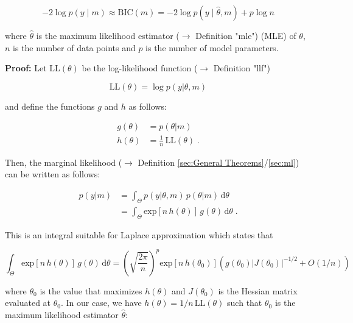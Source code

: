 \documentclass[a4paper,12pt]{book}
\begin{document}
\begin{equation} \label{eq:bic-der-BIC}
-2 \log p(y \mid m) \approx \mathrm{BIC}(m) = -2 \log p(y \mid \hat{\theta}, m) + p \log n
\end{equation}

where $\hat{\theta}$ is the maximum likelihood estimator ($\rightarrow$ Definition "mle") (MLE) of $\theta$, $n$ is the number of data points and $p$ is the number of model parameters.


\vspace{1em}
\textbf{Proof:} Let $\mathrm{LL}(\theta)$ be the log-likelihood function ($\rightarrow$ Definition "llf")

\begin{equation} \label{eq:bic-der-LL}
\mathrm{LL}(\theta) = \log p(y|\theta,m)
\end{equation}

and define the functions $g$ and $h$ as follows:

\begin{equation} \label{eq:bic-der-gh}
\begin{split}
g(\theta) &= p(\theta|m) \\
h(\theta) &= \frac{1}{n} \, \mathrm{LL}(\theta) \; .
\end{split}
\end{equation}

Then, the marginal likelihood ($\rightarrow$ Definition \ref{sec:General Theorems}/\ref{sec:ml}) can be written as follows:

\begin{equation} \label{eq:bic-der-ML}
\begin{split}
p(y|m) &= \int_{\Theta} p(y|\theta,m) \, p(\theta|m) \, \mathrm{d}\theta \\
&= \int_{\Theta} \mathrm{exp}\left[n \, h(\theta)\right] \, g(\theta) \, \mathrm{d}\theta \; .
\end{split}
\end{equation}

This is an integral suitable for Laplace approximation which states that

\begin{equation} \label{eq:bic-der-LA}
\int_{\Theta} \mathrm{exp}\left[n \, h(\theta)\right] \, g(\theta) \, \mathrm{d}\theta = \left( \sqrt{\frac{2 \pi}{n}} \right)^p \mathrm{exp}\left[n \, h(\theta_0)\right] \left( g(\theta_0) \left| J(\theta_0) \right|^{-1/2} + O(1/n) \right)
\end{equation}

where $\theta_0$ is the value that maximizes $h(\theta)$ and $J(\theta_0)$ is the Hessian matrix evaluated at $\theta_0$. In our case, we have $h(\theta) = 1/n \, \mathrm{LL}(\theta)$ such that $\theta_0$ is the maximum likelihood estimator $\hat{\theta}$:
\end{document}
